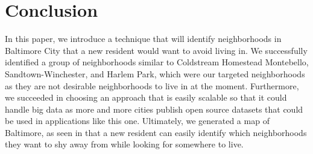 \documentclass[conference]{IEEEtran}
\begin{document}
%






\section{Conclusion}
In this paper, we introduce a technique that will identify neighborhoods in Baltimore City that a new resident would want
to avoid living in. We successfully identified a group of neighborhoods similar to Coldstream Homestead Montebello, Sandtown-Winchester,
and Harlem Park, which were our targeted neighborhoods as they are not desirable neighborhoods to live in at the moment.
Furthermore, we succeeded in choosing an approach that is easily scalable so that it could handle big data as more and more
cities publish open source datasets that could be used in applications like this one.
Ultimately, we generated a map of Baltimore, as seen in that a new resident can easily identify which
neighborhoods they want to shy away from while looking for somewhere to live.
\end{document}
